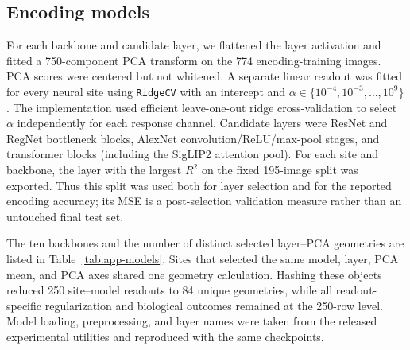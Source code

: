 \subsection{Encoding models}
\label{sec:app-methods-models}
For each backbone and candidate layer, we flattened the layer activation and
fitted a 750-component PCA transform on the 774 encoding-training images.  PCA
scores were centered but not whitened.  A separate linear readout was fitted
for every neural site using \texttt{RidgeCV} with an intercept and
$\alpha\in\{10^{-4},10^{-3},\ldots,10^9\}$.  The implementation used efficient
leave-one-out ridge cross-validation to select $\alpha$ independently for each
response channel.  Candidate layers were ResNet and RegNet bottleneck blocks,
AlexNet convolution/ReLU/max-pool stages, and transformer blocks (including
the SigLIP2 attention pool).  For each site and backbone, the layer with the
largest $R^2$ on the fixed 195-image split was exported.  Thus this split was
used both for layer selection and for the reported encoding accuracy; its MSE
is a post-selection validation measure rather than an untouched final test
set.

The ten backbones and the number of distinct selected layer--PCA geometries
are listed in Table~\ref{tab:app-models}.  Sites that selected the same model,
layer, PCA mean, and PCA axes shared one geometry calculation.  Hashing these
objects reduced 250 site--model readouts to 84 unique geometries, while all
readout-specific regularization and biological outcomes remained at the
250-row level.  Model loading, preprocessing, and layer names were taken from
the released experimental utilities and reproduced with the same checkpoints.

